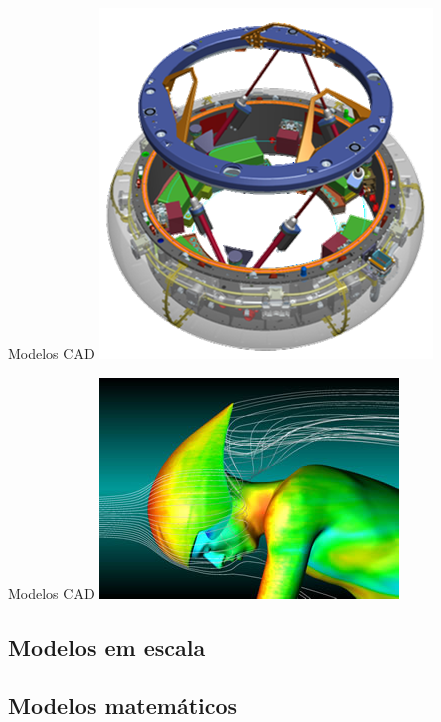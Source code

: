 \documentclass{beamer}
\begin{document}
\begin{frame}{Modelos CAD}
  \centering
  \includegraphics[height=\textheight]{modelos/NDS_CAD_drawing}
\end{frame}

\begin{frame}{Modelos CAD}
  \centering
  \includegraphics[width=\textwidth]{modelos/cycliste-cfd}
\end{frame}

\subsection{Modelos em escala}

\subsection{Modelos matemáticos}
\end{document}
